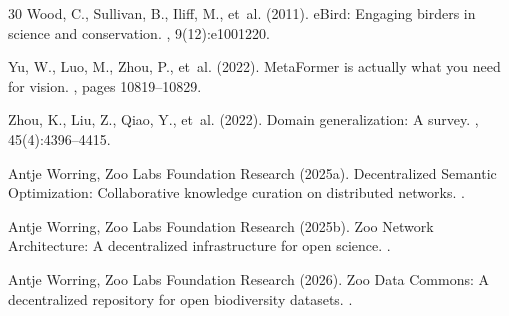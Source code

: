 \begin{thebibliography}{30}
Wood, C., Sullivan, B., Iliff, M., et~al. (2011).
\newblock eBird: Engaging birders in science and conservation.
, 9(12):e1001220.

Yu, W., Luo, M., Zhou, P., et~al. (2022).
\newblock MetaFormer is actually what you need for vision.
, pages 10819--10829.

Zhou, K., Liu, Z., Qiao, Y., et~al. (2022).
\newblock Domain generalization: A survey.
, 45(4):4396--4415.

Antje Worring, Zoo Labs Foundation Research (2025a).
\newblock Decentralized Semantic Optimization: Collaborative knowledge curation on distributed networks.
.

Antje Worring, Zoo Labs Foundation Research (2025b).
\newblock Zoo Network Architecture: A decentralized infrastructure for open science.
.

Antje Worring, Zoo Labs Foundation Research (2026).
\newblock Zoo Data Commons: A decentralized repository for open biodiversity datasets.
.

\end{thebibliography}

